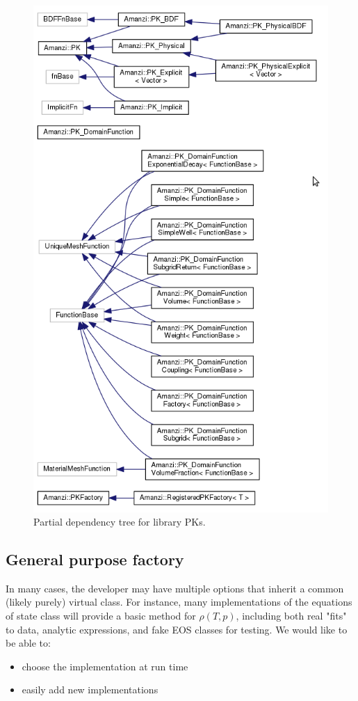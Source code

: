 \begin{figure}[h!]
\begin{center}
\includegraphics[height=0.9\textheight]{figs/pks.png}
\caption{Partial dependency tree for library PKs.\label{fig:pks}}
\end{center}
\end{figure}


\clearpage
\subsection{General purpose factory}
In many cases, the developer may have multiple options that inherit a
common (likely purely) virtual class.  
For instance, many implementations of the equations of state class will 
provide a basic method for $\rho(T,p)$,  including both real "fits" to 
data, analytic expressions, and fake EOS classes for testing. 
We would like to be able to:
\begin{itemize}
\item choose the implementation at run time
\item easily add new implementations
\end{itemize}

